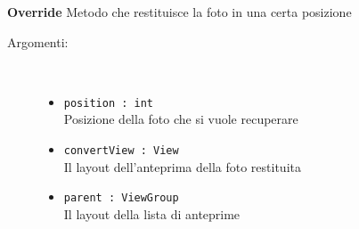 \documentclass[../DefinizioneDiProdotto.tex]{subfiles}
\begin{document}
\begin{description}
\begin{itemize}
		\textbf{Override} Metodo che restituisce la foto in una certa posizione
		\begin{description}
			\item[Argomenti:] \
			\begin{itemize}
				\item \texttt{position  : int}\\
				Posizione della foto che si vuole recuperare\item \texttt{convertView : View}\\
				Il layout dell'anteprima della foto restituita\item \texttt{parent : ViewGroup}\\
				Il layout della lista di anteprime\end{itemize}
		\end{description}
	\end{itemize}
\end{description}
\end{document}
